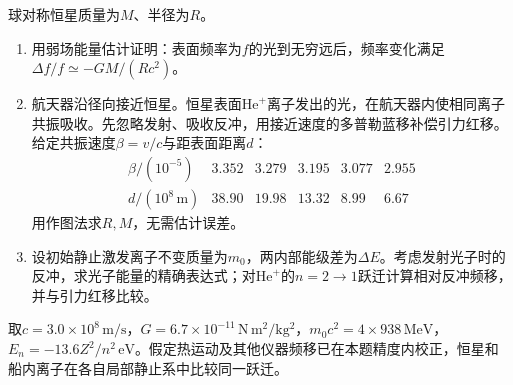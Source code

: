 \documentclass[UTF8,fontset=fandol,a4paper,11pt]{ctexart}
\begin{document}
球对称恒星质量为$M$、半径为$R$。
\begin{enumerate}
\item 用弱场能量估计证明：表面频率为$f$的光到无穷远后，频率变化满足$\Delta f/f\simeq-GM/(Rc^2)$。
\item 航天器沿径向接近恒星。恒星表面$\mathrm{He}^+$离子发出的光，在航天器内使相同离子共振吸收。先忽略发射、吸收反冲，用接近速度的多普勒蓝移补偿引力红移。给定共振速度$\beta=v/c$与距表面距离$d$：
\[
\begin{array}{c|ccccc}
\beta/(10^{-5})&3.352&3.279&3.195&3.077&2.955\\
d/(10^8\,\mathrm m)&38.90&19.98&13.32&8.99&6.67
\end{array}
\]
用作图法求$R,M$，无需估计误差。
\item 设初始静止激发离子不变质量为$m_0$，两内部能级差为$\Delta E$。考虑发射光子时的反冲，求光子能量的精确表达式；对$\mathrm{He}^+$的$n=2\to1$跃迁计算相对反冲频移，并与引力红移比较。
\end{enumerate}
取$c=3.0\times10^8\,\mathrm{m/s}$，$G=6.7\times10^{-11}\,\mathrm{N\,m^2/kg^2}$，$m_0c^2=4\times938\,\mathrm{MeV}$，$E_n=-13.6Z^2/n^2\,\mathrm{eV}$。假定热运动及其他仪器频移已在本题精度内校正，恒星和船内离子在各自局部静止系中比较同一跃迁。
\end{document}

